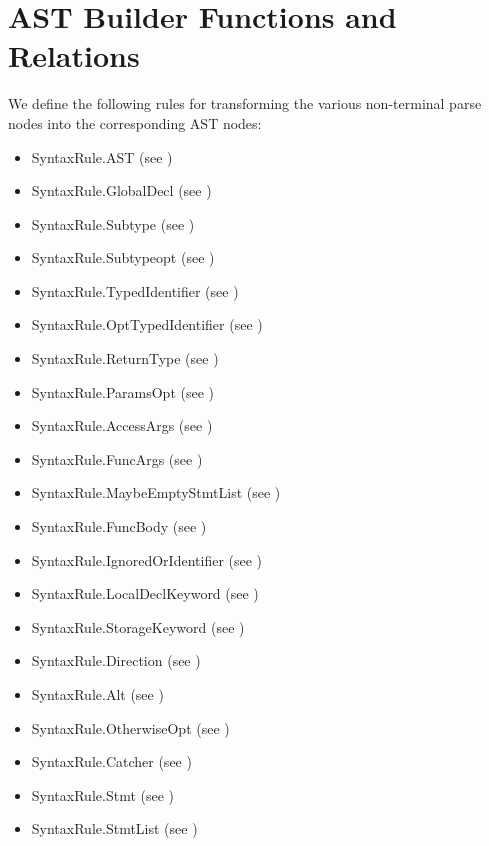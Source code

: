 \section{AST Builder Functions and Relations}
We define the following rules for transforming the various non-terminal parse nodes into
the corresponding AST nodes:
\begin{itemize}
  \item SyntaxRule.AST (see )
  \item SyntaxRule.GlobalDecl (see )
  \item SyntaxRule.Subtype (see )
  \item SyntaxRule.Subtypeopt (see )
  \item SyntaxRule.TypedIdentifier (see )
  \item SyntaxRule.OptTypedIdentifier (see )
  \item SyntaxRule.ReturnType (see )
  \item SyntaxRule.ParamsOpt (see )
  \item SyntaxRule.AccessArgs (see )
  \item SyntaxRule.FuncArgs (see )
  \item SyntaxRule.MaybeEmptyStmtList (see )
  \item SyntaxRule.FuncBody (see )
  \item SyntaxRule.IgnoredOrIdentifier (see )
  \item SyntaxRule.LocalDeclKeyword (see )
  \item SyntaxRule.StorageKeyword (see )
  \item SyntaxRule.Direction (see )
  \item SyntaxRule.Alt (see )
  \item SyntaxRule.OtherwiseOpt (see )
  \item SyntaxRule.Catcher (see )
  \item SyntaxRule.Stmt (see )
  \item SyntaxRule.StmtList (see )

\end{itemize}
